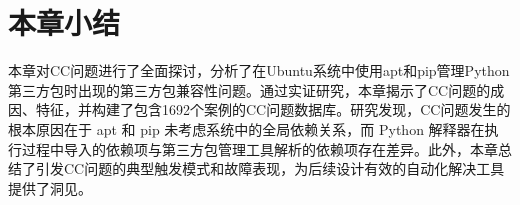 \section{本章小结}
本章对CC问题进行了全面探讨，分析了在Ubuntu系统中使用apt和pip管理Python第三方包时出现的第三方包兼容性问题。通过实证研究，本章揭示了CC问题的成因、特征，并构建了包含1692个案例的CC问题数据库。研究发现，CC问题发生的根本原因在于 apt 和 pip 未考虑系统中的全局依赖关系，而 Python 解释器在执行过程中导入的依赖项与第三方包管理工具解析的依赖项存在差异。此外，本章总结了引发CC问题的典型触发模式和故障表现，为后续设计有效的自动化解决工具提供了洞见。
